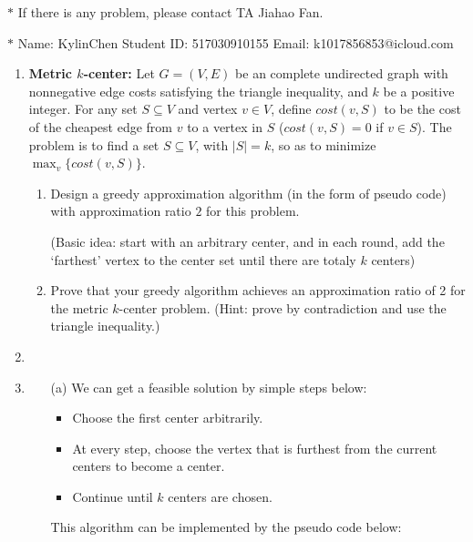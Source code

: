 \documentclass[12pt,a4paper]{article}
\makeatletter
\newtheorem*{solution}{Solution}
\theoremstyle{definition}
\renewenvironment{solution}[1][Solution] {\par\pushQED{\qed}\normalfont\topsep6\p@\@plus6\p@\relax\trivlist\item[\hskip\labelsep\bfseries#1\@addpunct{.}]\ignorespaces}{\popQED\endtrivlist\@endpefalse} \makeatother
\makeatother
\begin{document}
\noindent

\noindent{}
\begin{center}
\footnotesize{\color{red}$*$ If there is any problem, please contact TA Jiahao Fan.}

\footnotesize{\color{blue}$*$ Name: KylinChen  \quad Student ID: 517030910155 \quad Email: 
k1017856853@icloud.com}
\end{center}

\begin{enumerate}
    \item
    \textbf{Metric $k$-center:} Let $G = (V, E)$ be an complete undirected graph with nonnegative edge costs satisfying the triangle inequality, and $k$ be a positive integer. For any set $S \subseteq V$ and vertex $v \in V$, define $cost(v,S)$ to be the cost of the cheapest edge from $v$ to a vertex in $S$ ($cost(v, S) = 0$ if $v \in S$). The problem is to find a set $S \subseteq V$, with $|S| = k$, so as to minimize $\max_v\{cost(v, S)\}$.

    \begin{enumerate}
        \item
        Design a greedy approximation algorithm (in the form of pseudo code) with approximation ratio $2$ for this problem.

        (Basic idea: start with an arbitrary center, and in each round, add the `farthest' vertex to the center set until there are totaly $k$ centers)

        \item
        Prove that your greedy algorithm achieves an approximation ratio of 2 for the metric $k$-center problem. (Hint: prove by contradiction and use the triangle inequality.)
    \end{enumerate}

    \begin{solution}\item
    \renewcommand{\qedsymbol}{}
    \begin{itemize}
    \item [(a)] We can get a feasible solution by simple steps below:\par
    \begin{itemize}
    \item Choose the first center arbitrarily.
    \item At every step, choose the vertex that is furthest from the current centers to become a center.
    \item Continue until $k$ centers are chosen.
    \end{itemize}
    This algorithm can be implemented by the pseudo code below:\par
    

\end{itemize}
\end{solution}
\end{enumerate}
\end{document}
